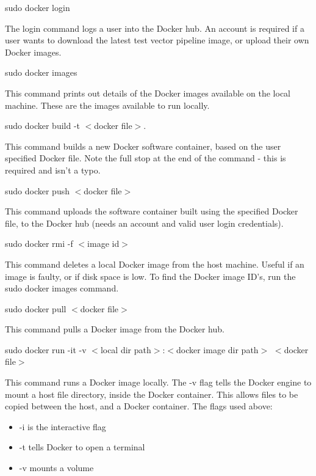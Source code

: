 \documentclass[preprint,authoryear,5p,twocolumn]{elsarticle_mod}
\begin{document}
sudo docker login \newline

The login command logs a user into the Docker hub. An account is required if a user wants to download the latest test vector pipeline image, or upload their own Docker images.\newline
 
sudo docker images\newline
 
This command prints out details of the Docker images available on the local machine. These are the images available to run locally.\newline
 
sudo docker build -t $<$docker file$>$.
 
This command builds a new Docker software container, based on the user specified Docker file. Note the full stop at the end of the command - this is required and isn’t a typo.\newline

sudo docker push $<$docker file$>$\newline

This command uploads the software container built using the specified Docker file, to the Docker hub (needs an account and valid user login credentials).\newline

sudo docker rmi -f $<$image id$>$\newline
 
This command deletes a local Docker image from the host machine. Useful if an image is faulty, or if disk space is low. To find the Docker image ID’s, run the sudo docker images command.\newline
 
sudo docker pull $<$docker file$>$\newline
 
This command pulls a Docker image from the Docker hub.\newline
 
sudo docker run -it -v $<$local dir path$>$:$<$docker image dir path$>$ $<$docker file$>$\newline
 
This command runs a Docker image locally. The -v flag tells the Docker engine to mount a host file directory, inside the Docker container. This allows files to be copied between the host, and a Docker container. The flags used above:\newline
\begin{itemize}
\item -i is the interactive flag
\item -t tells Docker to open a terminal 
\item -v mounts a volume
\end{itemize} 
\end{document}
